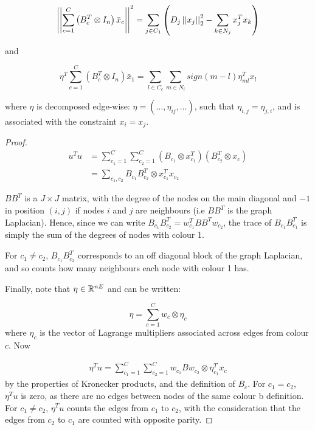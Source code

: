\begin{lemma}
\begin{equation}
\left|\left|\sum_{c=1}^C\left(B_c^T \otimes I_n\right)\bar{x}_c\right|\right|^2 = \sum_{j \in C_1}\left( D_j\left|\left|x_j\right|\right|_2^2 - \sum_{k \in N_j} x_j^Tx_k\right)
\end{equation}

and

\begin{equation}
\eta^T\sum_{c=1}^C\left(B_c^T \otimes I_n\right)\bar{x}_1 = \sum_{l\in C_c} \sum_{m\in N_l}sign\left(m-l\right)\eta_{ml}^T x_l
\end{equation}

where \(\eta\) is decomposed edge-wise: \(\eta = \left(\ldots, \eta_{ij},\ldots\right)\), such that \(\eta_{i,j} = \eta_{j,i}\), and is associated with the constraint \(x_i = x_j\).


\begin{proof}

\begin{align*}
u^Tu &= \sum	_{c_1=1}^C \sum	_{c_2=1}^C  \left(B_{c_1} \otimes x_{c_1}^T\right) \left(B_{c_2}^T \otimes x_c\right) \\
&= \sum_{c_1, c_2} B_{c_1}B_{c_2}^T \otimes x_{c_1}^Tx_{c_2}
\end{align*}

\(BB^T\) is a \(J \times J\) matrix, with the degree of the nodes on the main diagonal and \(-1\) in position \(\left(i,j\right)\) if nodes \(i\) and \(j\) are neighbours (i.e \(BB^T\) is the graph Laplacian). Hence, since we can write \(B_{c_1}B_{c_2}^T = w_{c_1}^TBB^Tw_{c_2}\), the trace of \(B_{c_1}B_{c_1}^T\) is simply the sum of the degrees of nodes with colour 1. 

For \(c_1 \neq c_2\),  \(B_{c_1}B_{c_2}^T\) corresponds to an off diagonal block of the graph Laplacian, and so counts how many neighbours each node with colour 1 has.

Finally, note that \(\eta \in {\mathbb{R}}^{nE}\) and can be written:

\begin{equation}
\eta = \sum_{c=1}^C w_c \otimes \eta_c
\end{equation}
where \(\eta_c\) is the vector of Lagrange multipliers associated across edges from colour \(c\). Now

\begin{align*}
\eta^Tu = \sum_{c_1=1}^C\sum_{c_2=1}^C w_{c_1}Bw_{c_2} \otimes \eta_{c_1}^Tx_c
\end{align*}
by the properties of Kronecker products, and the definition of \(B_c\). For \(c_1=c_2\), \(\eta^Tu\) is zero, as there are no edges between nodes of the same colour b definition. For \(c_1\neq c_2\), \(\eta^Tu\) counts the edges from \(c_1\) to \(c_2\), with the consideration that the edges from \(c_2\) to \(c_1\) are counted with opposite parity.
\end{proof}
\end{lemma}

